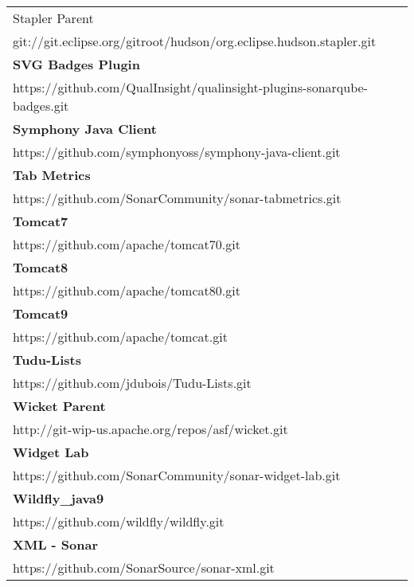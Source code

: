 \begin{table}[]
\begin{tabular}{|p{130mm}|}
Stapler Parent                                     \\ git://git.eclipse.org/gitroot/hudson/org.eclipse.hudson.stapler.git          \\ \hline \bf
SVG Badges Plugin                                  \\ https://github.com/QualInsight/qualinsight-plugins-sonarqube-badges.git      \\ \hline \bf
Symphony Java Client                               \\ https://github.com/symphonyoss/symphony-java-client.git                      \\ \hline \bf 
Tab Metrics                                        \\ https://github.com/SonarCommunity/sonar-tabmetrics.git                       \\ \hline \bf
Tomcat7                                            \\ https://github.com/apache/tomcat70.git                                       \\ \hline \bf
Tomcat8                                            \\ https://github.com/apache/tomcat80.git                                       \\ \hline \bf
Tomcat9                                            \\ https://github.com/apache/tomcat.git                                         \\ \hline \bf
Tudu-Lists                                         \\ https://github.com/jdubois/Tudu-Lists.git                                    \\ \hline \bf
Wicket Parent                                      \\ http://git-wip-us.apache.org/repos/asf/wicket.git                            \\ \hline \bf
Widget Lab                                         \\ https://github.com/SonarCommunity/sonar-widget-lab.git                       \\ \hline \bf
Wildfly\_java9                                     \\ https://github.com/wildfly/wildfly.git                                       \\ \hline \bf
XML - Sonar                                            \\ https://github.com/SonarSource/sonar-xml.git                                 \\ \hline

\end{tabular}
\end{table}
